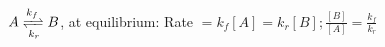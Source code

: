 $A \xrightleftharpoons[k_r]{k_f} B$, at equilibrium: Rate $= k_f [A] = k_r[B]; \frac{[B]}{[A]} = \frac{k_f}{k_r}$